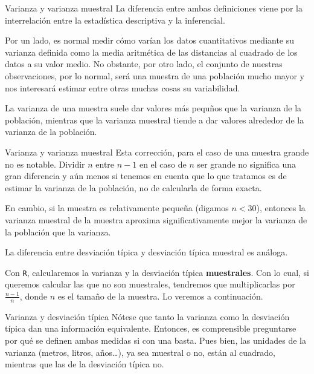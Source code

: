 \documentclass[
  ignorenonframetext,
]{beamer}
\begin{document}
\begin{frame}{Varianza y varianza muestral}
\label{varianza-y-varianza-muestral}
La diferencia entre ambas definiciones viene por la interrelación entre
la estadística descriptiva y la inferencial.

Por un lado, es normal medir cómo varían los datos cuantitativos
mediante su varianza definida como la media aritmética de las distancias
al cuadrado de los datos a su valor medio. No obstante, por otro lado,
el conjunto de nuestras observaciones, por lo normal, será una muestra
de una población mucho mayor y nos interesará estimar entre otras muchas
cosas su variabilidad.

La varianza de una muestra suele dar valores más pequños que la varianza
de la población, mientras que la varianza muestral tiende a dar valores
alrededor de la varianza de la población.
\end{frame}

\begin{frame}[fragile]{Varianza y varianza muestral}
\label{varianza-y-varianza-muestral-1}
Esta corrección, para el caso de una muestra grande no es notable.
Dividir \(n\) entre \(n-1\) en el caso de \(n\) ser grande no significa
una gran diferencia y aún menos si tenemos en cuenta que lo que tratamos
es de estimar la varianza de la población, no de calcularla de forma
exacta.

En cambio, si la muestra es relativamente pequeña (digamos \(n<30\)),
entonces la varianza muestral de la muestra aproxima significativamente
mejor la varianza de la población que la varianza.

La diferencia entre desviación típica y desviación típica muestral es
análoga.

Con \texttt{R}, calcularemos la varianza y la desviación típica
\textbf{muestrales}. Con lo cual, si queremos calcular las que no son
muestrales, tendremos que multiplicarlas por \(\frac{n-1}{n}\), donde
\(n\) es el tamaño de la muestra. Lo veremos a continuación.
\end{frame}

\begin{frame}{Varianza y desviación típica}
\label{varianza-y-desviaciuxf3n-tuxedpica}
Nótese que tanto la varianza como la desviación típica dan una
información equivalente. Entonces, es comprensible preguntarse por qué
se definen ambas medidas si con una basta. Pues bien, las unidades de la
varianza (metros, litros, años\ldots), ya sea muestral o no, están al
cuadrado, mientras que las de la desviación típica no.
\end{frame}
\end{document}
